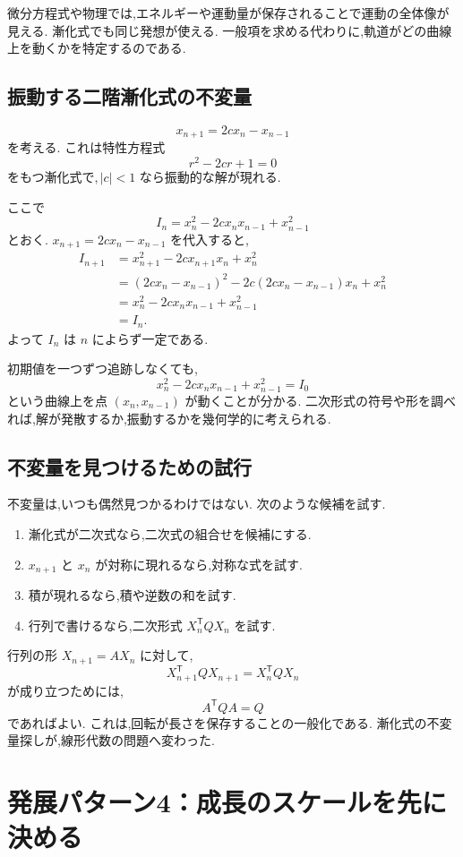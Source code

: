 微分方程式や物理では,エネルギーや運動量が保存されることで運動の全体像が見える.
漸化式でも同じ発想が使える.
一般項を求める代わりに,軌道がどの曲線上を動くかを特定するのである.

\subsection{振動する二階漸化式の不変量}

\[
  x_{n+1}=2c x_n-x_{n-1}
\]
を考える.
これは特性方程式
\[
  r^2-2cr+1=0
\]
をもつ漸化式で,\,$|c|<1$ なら振動的な解が現れる.

ここで
\[
  I_n=x_n^2-2c x_nx_{n-1}+x_{n-1}^2
\]
とおく.
$x_{n+1}=2cx_n-x_{n-1}$ を代入すると,
\[
\begin{aligned}
 I_{n+1}
 &=x_{n+1}^2-2cx_{n+1}x_n+x_n^2\\
 &=(2cx_n-x_{n-1})^2
   -2c(2cx_n-x_{n-1})x_n+x_n^2\\
 &=x_n^2-2cx_nx_{n-1}+x_{n-1}^2\\
 &=I_n.
\end{aligned}
\]
よって $I_n$ は $n$ によらず一定である.

初期値を一つずつ追跡しなくても,
\[
  x_n^2-2c x_nx_{n-1}+x_{n-1}^2=I_0
\]
という曲線上を点 $(x_n,x_{n-1})$ が動くことが分かる.
二次形式の符号や形を調べれば,解が発散するか,振動するかを幾何学的に考えられる.

\subsection{不変量を見つけるための試行}

不変量は,いつも偶然見つかるわけではない.
次のような候補を試す.

\begin{enumerate}
  \item 漸化式が二次式なら,二次式の組合せを候補にする.
  \item $x_{n+1}$ と $x_n$ が対称に現れるなら,対称な式を試す.
  \item 積が現れるなら,積や逆数の和を試す.
  \item 行列で書けるなら,二次形式 $X_n^{\mathsf T}QX_n$ を試す.
\end{enumerate}

行列の形 $X_{n+1}=AX_n$ に対して,
\[
  X_{n+1}^{\mathsf T}QX_{n+1}
  =X_n^{\mathsf T}QX_n
\]
が成り立つためには,
\[
  A^{\mathsf T}QA=Q
\]
であればよい.
これは,回転が長さを保存することの一般化である.
漸化式の不変量探しが,線形代数の問題へ変わった.

\section{発展パターン4：成長のスケールを先に決める}


